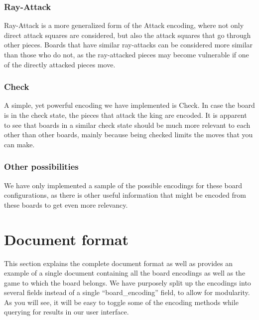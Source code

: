 \documentclass[11pt]{article}
\begin{document}
    \subsubsection{Ray-Attack}

    Ray-Attack is a more generalized form of the Attack encoding, where not only direct attack squares are considered, but also the attack squares that go through other pieces. Boards that have similar ray-attacks can be considered more similar than those who do not, as the ray-attacked pieces may become vulnerable if one of the directly attacked pieces move.

    \subsubsection{Check}

    A simple, yet powerful encoding we have implemented is Check. In case the board is in the check state, the pieces that attack the king are encoded. It is apparent to see that boards in a similar check state should be much more relevant to each other than other boards, mainly because being checked limits the moves that you can make.

    \subsubsection{Other possibilities}

    We have only implemented a sample of the possible encodings for these board configurations, as there is other useful information that might be encoded from these boards to get even more relevancy.



    \section{Document format}\label{sec:documentformat}


    This section explains the complete document format as well as provides an example of a single document containing all the board encodings as well as the game to which the board belongs. We have purposely split up the encodings into several fields instead of a single ``board\_encoding'' field, to allow for modularity. As you will see, it will be easy to toggle some of the encoding methods while querying for results in our user interface.
\end{document}
